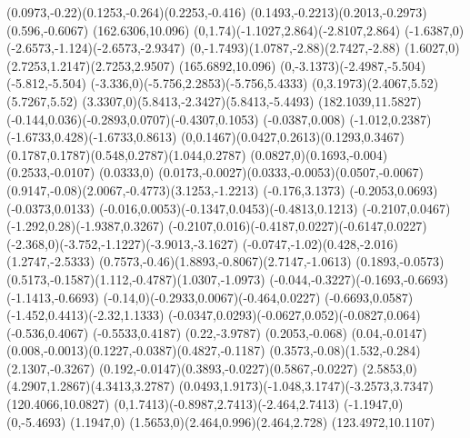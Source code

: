 {    \rcurveto(0.0973,-0.22)(0.1253,-0.264)(0.2253,-0.416)
    \rcurveto(0.1493,-0.2213)(0.2013,-0.2973)(0.596,-0.6067)
    \moveto(162.6306,10.096)%
    \rcurveto(0,1.74)(-1.1027,2.864)(-2.8107,2.864)
    \rcurveto(-1.6387,0)(-2.6573,-1.124)(-2.6573,-2.9347)
    \rcurveto(0,-1.7493)(1.0787,-2.88)(2.7427,-2.88)
    \rcurveto(1.6027,0)(2.7253,1.2147)(2.7253,2.9507)
    \moveto(165.6892,10.096)%
    \rcurveto(0,-3.1373)(-2.4987,-5.504)(-5.812,-5.504)
    \rcurveto(-3.336,0)(-5.756,2.2853)(-5.756,5.4333)
    \rcurveto(0,3.1973)(2.4067,5.52)(5.7267,5.52)
    \rcurveto(3.3307,0)(5.8413,-2.3427)(5.8413,-5.4493)
    \moveto(182.1039,11.5827)%
    \rcurveto(-0.144,0.036)(-0.2893,0.0707)(-0.4307,0.1053)
    \rlineto(-0.0387,0.008)
    \rcurveto(-1.012,0.2387)(-1.6733,0.428)(-1.6733,0.8613)
    \rcurveto(0,0.1467)(0.0427,0.2613)(0.1293,0.3467)
    \rcurveto(0.1787,0.1787)(0.548,0.2787)(1.044,0.2787)
    \rcurveto(0.0827,0)(0.1693,-0.004)(0.2533,-0.0107)
    \rlineto(0.0333,0)
    \rcurveto(0.0173,-0.0027)(0.0333,-0.0053)(0.0507,-0.0067)
    \rcurveto(0.9147,-0.08)(2.0067,-0.4773)(3.1253,-1.2213)
    \rlineto(-0.176,3.1373)
    \rlineto(-0.2053,0.0693)
    \rlineto(-0.0373,0.0133)
    \rcurveto(-0.016,0.0053)(-0.1347,0.0453)(-0.4813,0.1213)
    \rcurveto(-0.2107,0.0467)(-1.292,0.28)(-1.9387,0.3267)
    \rcurveto(-0.2107,0.016)(-0.4187,0.0227)(-0.6147,0.0227)
    \rcurveto(-2.368,0)(-3.752,-1.1227)(-3.9013,-3.1627)
    \rcurveto(-0.0747,-1.02)(0.428,-2.016)(1.2747,-2.5333)
    \rcurveto(0.7573,-0.46)(1.8893,-0.8067)(2.7147,-1.0613)
    \rlineto(0.1893,-0.0573)
    \rcurveto(0.5173,-0.1587)(1.112,-0.4787)(1.0307,-1.0973)
    \rcurveto(-0.044,-0.3227)(-0.1693,-0.6693)(-1.1413,-0.6693)
    \rcurveto(-0.14,0)(-0.2933,0.0067)(-0.464,0.0227)
    \rcurveto(-0.6693,0.0587)(-1.452,0.4413)(-2.32,1.1333)
    \rcurveto(-0.0347,0.0293)(-0.0627,0.052)(-0.0827,0.064)
    \rlineto(-0.536,0.4067)
    \rlineto(-0.5533,0.4187)
    \rlineto(0.22,-3.9787)
    \rlineto(0.2053,-0.068)
    \rlineto(0.04,-0.0147)
    \rcurveto(0.008,-0.0013)(0.1227,-0.0387)(0.4827,-0.1187)
    \rcurveto(0.3573,-0.08)(1.532,-0.284)(2.1307,-0.3267)
    \rcurveto(0.192,-0.0147)(0.3893,-0.0227)(0.5867,-0.0227)
    \rcurveto(2.5853,0)(4.2907,1.2867)(4.3413,3.2787)
    \rcurveto(0.0493,1.9173)(-1.048,3.1747)(-3.2573,3.7347)
    \moveto(120.4066,10.0827)%
    \rcurveto(0,1.7413)(-0.8987,2.7413)(-2.464,2.7413)
    \rlineto(-1.1947,0)
    \rlineto(0,-5.4693)
    \rlineto(1.1947,0)
    \rcurveto(1.5653,0)(2.464,0.996)(2.464,2.728)
    \moveto(123.4972,10.1107)%
}
